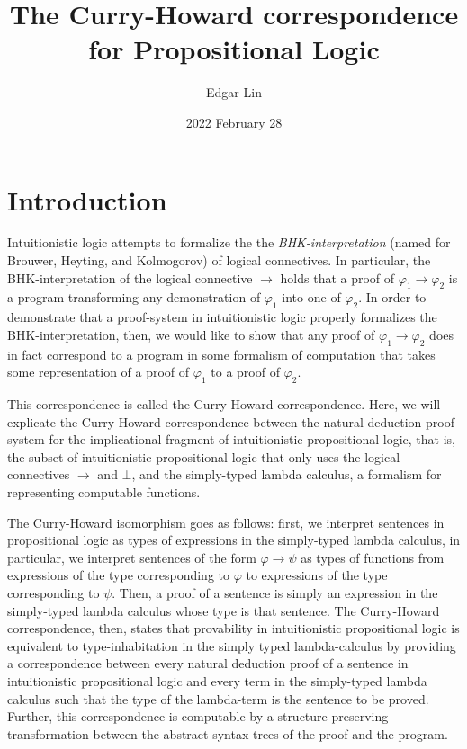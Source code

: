\documentclass[12pt]{article}
\title{The Curry-Howard correspondence for Propositional Logic}
\date{2022 February 28}
\author{Edgar Lin}
\begin{document}
\maketitle
\section{Introduction}
Intuitionistic logic attempts to formalize the the \textit{BHK-interpretation} (named for Brouwer, Heyting, and Kolmogorov) of logical connectives. 
In particular, the BHK-interpretation of the logical connective $\to$ holds that a proof of $\varphi_1\to\varphi_2$ is a program transforming any demonstration of $\varphi_1$ into one of $\varphi_2$. 
In order to demonstrate that a proof-system in intuitionistic logic properly formalizes the BHK-interpretation, then, we would like to show that any proof of $\varphi_1\to\varphi_2$ does in fact correspond to a program in some formalism of computation that takes some representation of a proof of $\varphi_1$ to a proof of $\varphi_2$.  

This correspondence is called the Curry-Howard correspondence. Here, we will explicate the Curry-Howard correspondence between the natural deduction proof-system for the implicational fragment of intuitionistic propositional logic, that is, the subset of intuitionistic propositional logic that only uses the logical connectives $\to$ and $\bot$, and the simply-typed lambda calculus, a formalism for representing computable functions. 

The Curry-Howard isomorphism goes as follows: first, we interpret sentences in propositional logic as types of expressions in the simply-typed lambda calculus, in particular, we interpret sentences of the form $\varphi\to\psi$ as types of functions from expressions of the type corresponding to $\varphi$ to expressions of the type corresponding to $\psi$. 
Then, a proof of a sentence is simply an expression in the simply-typed lambda calculus whose type is that sentence. 
The Curry-Howard correspondence, then, states 
that provability in intuitionistic propositional logic is equivalent to type-inhabitation in the simply typed lambda-calculus 
by providing a correspondence between every natural deduction proof of a sentence in intuitionistic propositional logic and 
every term in the simply-typed lambda calculus such that the type of the lambda-term is the sentence to be proved. 
Further, this correspondence is computable by a structure-preserving transformation between the abstract syntax-trees of the proof and the program.  
\end{document}
